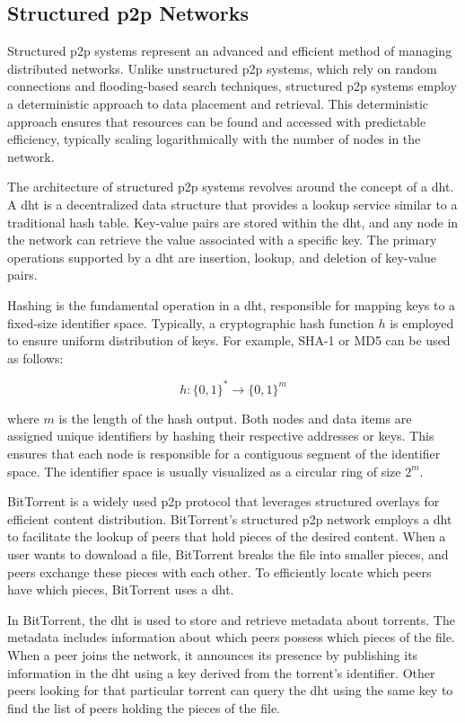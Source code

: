 \subsection{Structured \gls{p2p} Networks}
Structured \gls{p2p} systems represent an advanced and efficient method of managing distributed networks.
Unlike unstructured \gls{p2p} systems, which rely on random connections and flooding-based search techniques, structured \gls{p2p} systems employ a deterministic approach to data placement and retrieval.
This deterministic approach ensures that resources can be found and accessed with predictable efficiency, typically scaling logarithmically with the number of nodes in the network.

The architecture of structured \gls{p2p} systems revolves around the concept of a \gls{dht}.
A \gls{dht} is a decentralized data structure that provides a lookup service similar to a traditional hash table.
Key-value pairs are stored within the \gls{dht}, and any node in the network can retrieve the value associated with a specific key.
The primary operations supported by a \gls{dht} are insertion, lookup, and deletion of key-value pairs.

Hashing is the fundamental operation in a \gls{dht}, responsible for mapping keys to a fixed-size identifier space.
Typically, a cryptographic hash function $h$ is employed to ensure uniform distribution of keys.
For example, SHA-1 or MD5 can be used as follows:

\[h: \{0,1\}^* \rightarrow \{0,1\}^{m} \]

where $m$ is the length of the hash output.
Both nodes and data items are assigned unique identifiers by hashing their respective addresses or keys.
This ensures that each node is responsible for a contiguous segment of the identifier space.
The identifier space is usually visualized as a circular ring of size $2^m$.

BitTorrent is a widely used \gls{p2p} protocol that leverages structured overlays for efficient content distribution.
BitTorrent's structured \gls{p2p} network employs a \gls{dht} to facilitate the lookup of peers that hold pieces of the desired content.
When a user wants to download a file, BitTorrent breaks the file into smaller pieces, and peers exchange these pieces with each other.
To efficiently locate which peers have which pieces, BitTorrent uses a \gls{dht}.

In BitTorrent, the \gls{dht} is used to store and retrieve metadata about torrents.
The metadata includes information about which peers possess which pieces of the file.
When a peer joins the network, it announces its presence by publishing its information in the \gls{dht} using a key derived from the torrent's identifier.
Other peers looking for that particular torrent can query the \gls{dht} using the same key to find the list of peers holding the pieces of the file.

